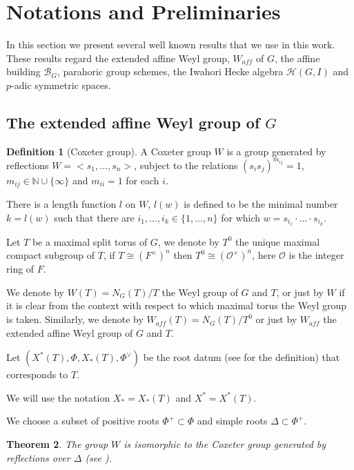 \documentclass[12pt]{article}
\newcommand{\B}{\mathcal{B}}
\newcommand{\s}{\mathcal{O}}
\newcommand{\<}{\langle}
\renewcommand{\>}{\rangle}
\theoremstyle{plain}
\newtheorem{theorem}{Theorem}[section] %
\theoremstyle{definition}
\newtheorem{defn}[theorem]{Definition} %
\begin{document}
\section{Notations and Preliminaries}

In this section we present several well known results that we use in this work. These results regard the extended affine Weyl group, $W_{aff}$ of $G$, the affine building $\B_G$, parahoric group schemes, the Iwahori Hecke algebra $\mathcal{H}(G,I)$ and $p$-adic symmetric spaces.

\subsection{The extended affine Weyl group of $G$}
\label{2.1}


\begin{defn}[Coxeter group]
A Coxeter group $W$ is a group generated by reflections $W=<s_1,...,s_n>$, subject to the relations $(s_is_j)^{m_{ij}}=1$, $m_{ij}\in \mathbb{N}\cup\{\infty\}$ and $m_{ii}=1$ for each $i$.
    
    There is a length function $l$ on $W$, $l(w)$ is defined to be the minimal number $k=l(w)$ such that there are $i_1,...,i_k\in \{1,...,n\}$ for which $w=s_{i_1}\cdot...\cdot s_{i_k}$.

\end{defn}
Let $T$ be a maximal split torus of $G$, we denote by $T^0$ the unique maximal compact subgroup of $T$, if $T\cong (F^\times)^n$ then $T^0\cong (\s^\times)^n$, here $\s$ is the integer ring of $F$.

We denote by $W(T)=N_G(T)/T$ the Weyl group of $G$ and $T$, or just by $W$ if it is clear from the context with respect to which maximal torus the Weyl group is taken. Similarly, we denote by $W_{aff}(T)=N_G(T)/T^0$ or just by $W_{aff}$ the extended affine Weyl group of $G$ and $T$.

Let $(X^*(T),\Phi,X_*(T),\Phi^\vee)$ be the root datum (see \cite{Springer1998} for the definition) that corresponds to $T$.


We will use the notation $X_*=X_*(T)$ and $X^*=X^*(T)$. 

We choose a subset of positive roots $\Phi^+\subset \Phi$ and simple roots $\Delta\subset \Phi^+$. 



\begin{theorem}
The group $W$ is isomorphic to the Coxeter group generated by reflections over $\Delta$ (see \cite{LAG}).
\end{theorem} 
\end{document}
